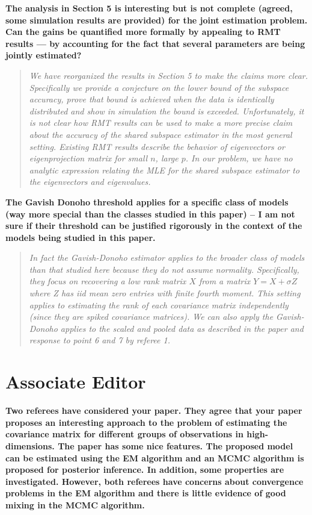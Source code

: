 \documentclass{article}
\newenvironment{resp}{\begin{quotation}\noindent\slshape}{\end{quotation}}
\begin{document}
\textbf{The analysis in Section 5 is interesting but is not complete (agreed, some simulation results
are provided) for the joint estimation problem. Can the gains be quantified more formally
by appealing to RMT results — by accounting for the fact that several parameters are being
jointly estimated?}

\begin{resp}
We have reorganized the results in Section 5 to make the claims more clear.  Specifically we provide a conjecture on the lower bound of the subspace accuracy, prove that bound is achieved when the data is identically distributed and show in simulation the bound is exceeded.  Unfortunately, it is not clear how RMT results can be used to make a more precise claim about the accuracy of the shared subspace estimator in the most general setting.  Existing RMT results describe the behavior of eigenvectors or eigenprojection matrix for small $n$, large $p$.  In our problem, we have no analytic expression relating the MLE for the shared subspace estimator to the eigenvectors and eigenvalues.
\end{resp}

\textbf{The Gavish Donoho threshold applies for a specific class of models (way more special than
the classes studied in this paper) – I am not sure if their threshold can be justified rigorously
in the context of the models being studied in this paper.}

\begin{resp}
In fact the Gavish-Donoho estimator applies to the \emph{broader} class of models than that studied here because they do not assume normality.  Specifically, they focus on recovering a low rank matrix $X$ from a matrix $Y = X + \sigma Z$ where Z has iid mean zero entries with finite fourth moment.  This setting applies to estimating the rank of each covariance matrix independently (since they are spiked covariance matrices).  We can also apply the Gavish-Donoho applies to the scaled and pooled data as described in the paper and response to point 6 and 7 by referee 1. 
\end{resp}

\section*{Associate Editor}
\textbf{Two referees have considered your paper. They agree that your paper proposes an interesting approach to the problem of estimating the covariance matrix for different groups of observations in high-dimensions. The paper has some nice features. The proposed model can be estimated using the EM algorithm and an MCMC algorithm is proposed for posterior inference. In addition, some properties are investigated. However, both referees have concerns about convergence problems in the EM algorithm and there is little evidence of good mixing in the MCMC algorithm.} %
\end{document}
